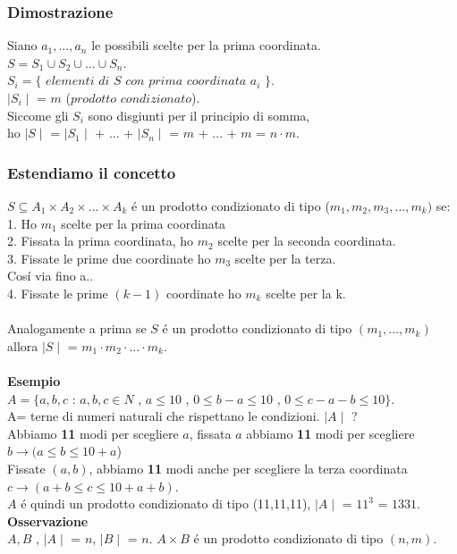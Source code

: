 \documentclass[11pt]{article}
\begin{document}
            \subsubsection{Dimostrazione}
            Siano $a_1,...,a_n$ le possibili scelte per la prima coordinata.\\
            $S=S_1 \cup S_2 \cup ... \cup S_n$.\\
            $S_i = \{$ $elementi$ $di$ $S$ $con$ $prima$ $coordinata$ $a_i$ $\}$.\\
            $\mid S_i \mid$ = $m$ ($prodotto$ $condizionato$).\\
            Siccome gli $S_i$ sono disgiunti per il principio di somma, \\
            ho $\mid S \mid$ = $\mid S_1 \mid$ + ... + $\mid S_n \mid$ = $m$ + $...$ + $m$ = $n \cdot m$.
            \subsubsection{Estendiamo il concetto}
            $S \subseteq A_1 \times A_2 \times ... \times A_k$ \'e un prodotto condizionato di tipo ($m_1,m_2,m_3,...,m_k)$ se:\\
            1. Ho $m_1$ scelte per la prima coordinata\\
            2. Fissata la prima coordinata, ho $m_2$ scelte per la seconda coordinata.\\
            3. Fissate le prime due coordinate ho $m_3$ scelte per la terza.\\
            Cos\'i via fino a..\\
            4. Fissate le prime $(k-1)$ coordinate ho $m_k$ scelte per la k.\\
            \\
            Analogamente a prima se $S$ \'e un prodotto condizionato di tipo $(m_1,...,m_k)$ allora $\mid S \mid $ = $m_1 \cdot m_2 \cdot ... \cdot m_k$.\\
            \\
            \textbf{Esempio}\\
            $A=\{a,b,c$ : $a,b,c \in N$ , $a \leq 10$ , $0\leq b-a \leq 10$ , $0 \leq c-a-b \leq 10 \}$.\\ A= terne di numeri naturali che rispettano le condizioni. $\mid A \mid $ ?
            \\Abbiamo \textbf{11} modi per scegliere $a$, fissata $a$ abbiamo \textbf{11} modi per scegliere $b\rightarrow(a \leq b \leq 10+a$)\\
            Fissate $(a,b)$, abbiamo \textbf{11} modi anche per scegliere la terza coordinata $c\rightarrow(a+b\leq c \leq 10+a+b)$.\\
            $A$ \'e quindi un prodotto condizionato di tipo (11,11,11), $\mid A \mid$ = $11^3$ = $1331$.\\
            \textbf{Osservazione}\\
            $A,B$ , $\mid A \mid $ = $n$, $\mid B \mid$ = $n$. $A \times B $ \'e un prodotto condizionato di tipo $(n,m)$.
\end{document}
